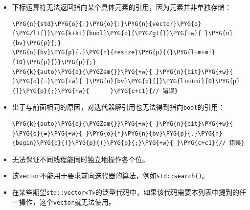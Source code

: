 \begin{itemize}
\item 下标运算符无法返回指向某个具体元素的引用，因为元素并非单独存储：



\begin{codeblockbg}
\begin{Verbatim}[commandchars=\\\{\},breaklines=true,breakanywhere=true,fontsize=\codefont,xleftmargin=17bp]
\PYG{n}{std}\PYG{o}{:}\PYG{o}{:}\PYG{n}{vector}\PYG{o}{\PYGZlt{}}\PYG{k+kt}{bool}\PYG{o}{\PYGZgt{}}\PYG{+w}{ }\PYG{n}{bv}\PYG{p}{;}
\PYG{n}{bv}\PYG{p}{.}\PYG{n}{resize}\PYG{p}{(}\PYG{l+m+mi}{10}\PYG{p}{)}\PYG{p}{;}
\PYG{k}{auto}\PYG{o}{\PYGZam{}}\PYG{+w}{ }\PYG{n}{bit}\PYG{+w}{ }\PYG{o}{=}\PYG{+w}{ }\PYG{n}{bv}\PYG{p}{[}\PYG{l+m+mi}{0}\PYG{p}{]}\PYG{p}{;}\PYG{+w}{      }\PYG{c+c1}{// 错误}
\end{Verbatim}
\end{codeblockbg}



\item 出于与前面相同的原因，对迭代器解引用也无法得到指向\texttt{bool}的引用：



\begin{codeblockbg}
\begin{Verbatim}[commandchars=\\\{\},breaklines=true,breakanywhere=true,fontsize=\codefont,xleftmargin=17bp]
\PYG{k}{auto}\PYG{o}{\PYGZam{}}\PYG{+w}{ }\PYG{n}{bit}\PYG{+w}{ }\PYG{o}{=}\PYG{+w}{ }\PYG{o}{*}\PYG{n}{bv}\PYG{p}{.}\PYG{n}{begin}\PYG{p}{(}\PYG{p}{)}\PYG{p}{;}\PYG{+w}{ }\PYG{c+c1}{// 错误}
\end{Verbatim}
\end{codeblockbg}



\item 无法保证不同线程能同时独立地操作各个位。



\item 该\texttt{vector}不能用于要求前向迭代器的算法，例如\texttt{std::\allowbreak{}search()}。



\item 在某些期望\texttt{std::\allowbreak{}vector<\allowbreak{}T>}的泛型代码中，如果该代码需要本列表中提到的任一操作，这个\texttt{vector}就无法使用。

\end{itemize}


